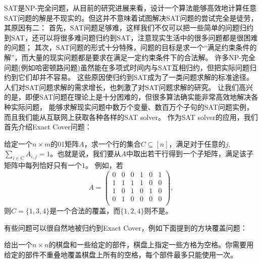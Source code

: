 SAT是NP-完全问题，从目前的研究进展来看，设计一个算法能够高效地计算任意SAT问题的解是不现实的。但这并不意味着试图解决SAT问题的尝试完全是徒劳，其原因有二：
首先，SAT问题足够难，这样我们不仅可以把一些简单的问题归约到SAT，还可以将很多难问题归约到SAT，注意现实生活中的很多问题都是很困难的问题；
其次，SAT问题的形式十分特殊，问题的目标是求一个``满足约束条件的解''，而大量的现实问题都是要求在满足一定约束条件下的合法解。
许多NP-完全问题(例如哈密顿路问题)虽然能在多项式时间内与SAT互相归约，但把实际问题归约到它们却并不容易。
这些原因使归约到SAT成为了一类问题求解的标准途径。人们对SAT问题求解的需求增长，也刺激了对SAT问题求解的研究。
让我们高兴的是，即便SAT问题在理论上是十分困难的，但很多算法确实能非常高效地解决各种实际问题，
能够求解现实问题中数万个变量、数百万个子句的SAT问题实例，而且我们能从互联网上获取各种各样的SAT solver。
作为SAT solver的应用，我们首先介绍Exact Cover问题：

\begin{prob}
 给定一个$n\times m$的01矩阵$A$，求一个行的集合$C\subseteq[n]$，满足对于任意的$j$, 
 $\sum_{i\in C} A_{i,j} = 1$。也就是说，我们要从$A$中取出若干行得到一个子矩阵，满足该子矩阵中每列恰好只有一个$1$。
 例如，若
 $$A = 
 \begin{pmatrix}
  0 & 0 & 0 & 1 & 0 & 1\\
  1 & 1 & 1 & 1 & 0 & 0\\
  1 & 0 & 1 & 0 & 1 & 0\\
  0 & 1 & 0 & 0 & 0 & 0\\
 \end{pmatrix},
 $$
 则$C=\{1, 3, 4\}$是一个合法的覆盖，而$\{1, 2, 4\}$则不是。
\end{prob}


有些问题可以很自然地被归约到Exact Cover，例如下面提到的方块覆盖问题：

\begin{prob}
给出一个$n\times n$的棋盘和一些给定的部件，棋盘上指定一些方格为空格。你需要用给定的部件不重叠地覆盖棋盘上所有的空格，每个部件最多只能使用一次。
\end{prob}

